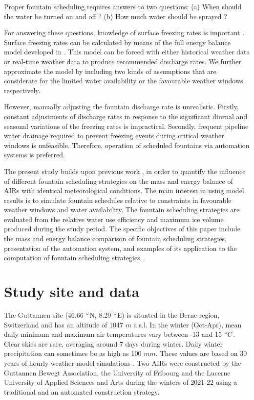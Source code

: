 \documentclass[tc, manuscript]{copernicus}
\begin{document}
Proper fountain scheduling requires answers to two questions: 
(a) When should the water be turned on and off ?
(b) How much water should be sprayed ? 

For answering these questions, knowledge of surface freezing rates is important . Surface freezing rates can be
calculated by means of the full energy balance model developed in
\cite{balasubramanianInfluenceMeteorologicalConditions2022}. This model can be forced with either historical
weather data or real-time weather data to produce recommended discharge rates. We further approximate the model
by including two kinds of assumptions that are considerate for the limited water availability or the favourable
weather windows respectively.

However, manually adjusting the fountain discharge rate is unrealistic. Firstly, constant adjustments of
discharge rates in response to the significant diurnal and seasonal variations of the freezing rates is
impractical. Secondly, frequent pipeline water drainage required to prevent freezing events during critical weather
windows is unfeasible. Therefore, operation of scheduled fountains via automation systems is preferred.

The present study builds upon previous work \citep{balasubramanianInfluenceMeteorologicalConditions2022,
oerlemansBriefCommunicationGrowth2021}, in order to quantify the influence of different fountain scheduling
strategies on the mass and energy balance of AIRs with identical meteorological conditions. The main interest in
using model results is to simulate fountain schedules relative to constraints in favourable weather windows and
water availability. The fountain scheduling strategies are evaluated from the relative water use efficiency and
maximum ice volume produced during the study period. The specific objectives of this paper include the mass and
energy balance comparison of fountain scheduling strategies, presentation of the automation system, and examples
of its application to the computation of fountain scheduling strategies.

\section{Study site and data}

The Guttannen site (46.66 $^{\circ}$N, 8.29 $^{\circ}$E) is situated in the Berne region, Switzerland and has an
altitude of 1047 $m$ a.s.l. In the winter (Oct-Apr), mean daily minimum and maximum air temperatures vary
between -13 and 15 $^{\circ} C$. Clear skies are rare, averaging around 7 days during winter. Daily winter
precipitation can sometimes be as high as 100 $mm$. These values are based on 30 years of hourly weather model
simulations \citep{guttannen}. Two AIRs were constructed by the Guttannen Bewegt Association, the University of
Fribourg and the Lucerne University of Applied Sciences and Arts during the winters of 2021-22 using a
traditional and an automated construction strategy.
\end{document}
